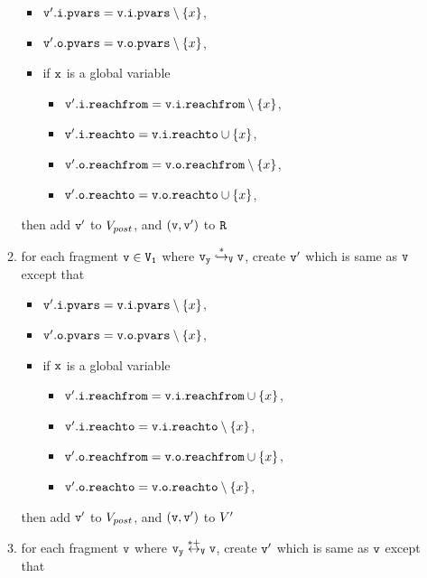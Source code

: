 \begin{itemize}
\begin{enumerate}
\begin{itemize}
\item $\mathtt{v}'.\mathtt{i}.\mathtt{pvars} = \mathtt{v}.\mathtt{i}.\mathtt{pvars} \setminus \left\{x\right\}$,
\item $\mathtt{v}'.\mathtt{o}.\mathtt{pvars} = \mathtt{v}.\mathtt{o}.\mathtt{pvars} \setminus \left\{x\right\}$,
\item if $\mathtt{x}$ is a global variable
\begin{itemize}
\item $\mathtt{v}'.\mathtt{i}.\mathtt{reachfrom} = \mathtt{v}.\mathtt{i}.\mathtt{reachfrom} \setminus \left\{x\right\}$,
\item $\mathtt{v}'.\mathtt{i}.\mathtt{reachto} = \mathtt{v}.\mathtt{i}.\mathtt{reachto} \cup \left\{x\right\}$,
\item $\mathtt{v}'.\mathtt{o}.\mathtt{reachfrom} = \mathtt{v}.\mathtt{o}.\mathtt{reachfrom} \setminus \left\{x\right\}$,
\item $\mathtt{v}'.\mathtt{o}.\mathtt{reachto} = \mathtt{v}.\mathtt{o}.\mathtt{reachto} \cup \left\{x\right\}$,
\end{itemize}
\end{itemize}
then add $\tt v'$ to $V_{post}$, and $\tt (v,v')$ to $\tt R$
\item for each fragment $\tt v \in V_1$ where $\tt \mathtt{v}_y \overset{*}\hookrightarrow_{V} v$, create $\tt v'$ which is same as $\tt v$ except that
\begin{itemize}
\item $\mathtt{v}'.\mathtt{i}.\mathtt{pvars} = \mathtt{v}.\mathtt{i}.\mathtt{pvars} \setminus \left\{x\right\}$,
\item $\mathtt{v}'.\mathtt{o}.\mathtt{pvars} = \mathtt{v}.\mathtt{o}.\mathtt{pvars} \setminus \left\{x\right\}$,
\item if $\mathtt{x}$ is a global variable
\begin{itemize}
\item $\mathtt{v}'.\mathtt{i}.\mathtt{reachfrom} = \mathtt{v}.\mathtt{i}.\mathtt{reachfrom} \cup \left\{x\right\}$,
\item $\mathtt{v}'.\mathtt{i}.\mathtt{reachto} = \mathtt{v}.\mathtt{i}.\mathtt{reachto} \setminus \left\{x\right\}$,
 \item $\mathtt{v}'.\mathtt{o}.\mathtt{reachfrom} = \mathtt{v}.\mathtt{o}.\mathtt{reachfrom} \cup \left\{x\right\}$,
 \item $\mathtt{v}'.\mathtt{o}.\mathtt{reachto} = \mathtt{v}.\mathtt{o}.\mathtt{reachto} \setminus \left\{x\right\}$,
\end{itemize}
\end{itemize}
then add $\tt v'$ to $V_{post}$, and $\tt (v,v')$ to $V'$
\item for each fragment $\tt v$ where $\tt \mathtt{v}_y \overset{*+}\leftrightarrow_{V} v$, create $\tt v'$ which is same as $\tt v$ except that
\begin{itemize}

\end{itemize}
\end{enumerate}
\end{itemize}
